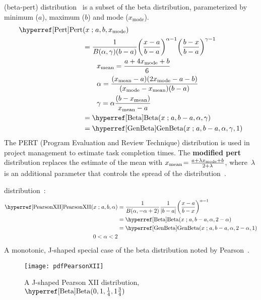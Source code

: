 (beta-pert) distribution~\cite{Clark1962, Vose2000} is a subset of the beta distribution, parameterized by minimum ($a$), maximum ($b$) and mode ($x_\text{mode}$).  
\begin{align}
\label{Pert}
\opr{Pert}&(x\given a,b,x_\text{mode}) \checked
\\ \notag
&=  
 \frac{1}{B(\alpha, \gamma) (b-a)}
\Left(\frac{x-a}{b-a}\Right)^{\alpha-1} \Left(\frac{b-x}{b-a}\Right)^{\gamma-1} \checked
\\ \notag & \qquad x_\text{mean} = \frac{a+4x_\text{mode}+b}{6} \checked
\\ & \qquad \alpha = \frac{(x_\text{mean}-a)(2 x_\text{mode} - a - b)}{(x_\text{mode}-x_\text{mean})(b-a)} \checked
\notag 
\\\notag  & \qquad \gamma = \alpha\frac{(b-x_\text{mean})}{x_\text{mean}-a} \checked
\\ & = \opr{Beta}(x\given a,b-a,\alpha,\gamma) \checked \notag
\\ & = \opr{GenBeta}(x\given  a,b-a,\alpha,\gamma, 1)  \checked \notag
\end{align}
The PERT (Program Evaluation and Review Technique) distribution is used in project management to estimate task completion times. The {\bf modified pert} distribution replaces the estimate of the mean with $x_\text{mean}\! = \frac{a+\lambda x_\text{mode}+b}{2+\lambda}$, where~$\lambda$ is an additional parameter that controls the spread of the distribution~\cite{Vose2000}.






 distribution~\cite{Pearson1916}: 
\begin{align}
\label{PearsonXII}
\opr{PearsonXII}(x\given a,b,\alpha) &=  \frac{1}{B(\alpha, -\alpha+2)} \frac{1}{|b-a|}\Left( \frac{x-a}{b-x} \Right)^{\alpha -1} 
\checked
\\ &= \opr{Beta}(x\given a,b-a ,\alpha, 2-\alpha) \notag  \checked
\\ &= \opr{GenBeta}(x\given a,b-a ,\alpha, 2-\alpha,1) \notag \checked
\\ \qquad 0<\alpha<2 \notag
\end{align}
A monotonic, J-shaped special case of the beta distribution noted by Pearson~\cite{Pearson1916}.

\begin{figure}[tp!]
\begin{center}
\texttt{[image: pdfPearsonXII]}
\end{center}
\caption[Pearson XII distribution]{A J-shaped Pearson XII distribution, $\opr{Beta}(0, 1, \tfrac{1}{4}, 1\tfrac{3}{4})$}
\end{figure}

